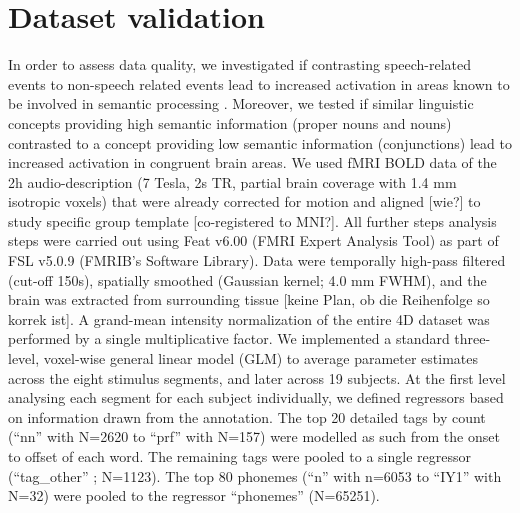 \documentclass[10pt,a4paper,twocolumn]{article}
\begin{document}
\section*{Dataset validation}
In order to assess data quality, we investigated if contrasting speech-related events to non-speech related events lead to increased activation in areas known to be involved in semantic processing \citep{binder2009semantic, dewitt2012phoneme}.
Moreover, we tested if similar linguistic concepts providing high semantic information (proper nouns and nouns) contrasted to a concept providing low semantic information (conjunctions) lead to increased activation in congruent brain areas.
We used fMRI BOLD data of the 2h audio-description (7 Tesla, 2s TR, partial
brain coverage with 1.4 mm isotropic voxels) \citep{hanke2014audiomovie} that
were already corrected for motion and aligned [wie?] to study specific group template [co-registered to MNI?].
All further steps analysis steps were carried out using Feat v6.00 (FMRI Expert
Analysis Tool)\citep{woolrich2001autocorr} as part of FSL v5.0.9 (FMRIB’s
Software Library)\citep{smith2004fsl}. Data were temporally high-pass filtered (cut-off 150s), spatially smoothed (Gaussian kernel; 4.0 mm FWHM), and the brain was extracted from surrounding tissue [keine Plan, ob die Reihenfolge so korrek ist]. A grand-mean intensity normalization of the entire 4D dataset was performed by a single multiplicative factor.
We implemented a standard three-level, voxel-wise general linear model (GLM) to average parameter estimates across the eight stimulus segments, and later across 19 subjects.
At the first level analysing each segment for each subject individually, we defined regressors based on information drawn from the annotation. The top 20 detailed tags by count (“nn” with N=2620 to “prf” with N=157) were modelled as such from the onset to offset of each word. The remaining tags were pooled to a single regressor (“tag\_other” ; N=1123). The top 80 phonemes (“n” with n=6053 to “IY1” with N=32) were pooled to the regressor “phonemes” (N=65251).
\end{document}
